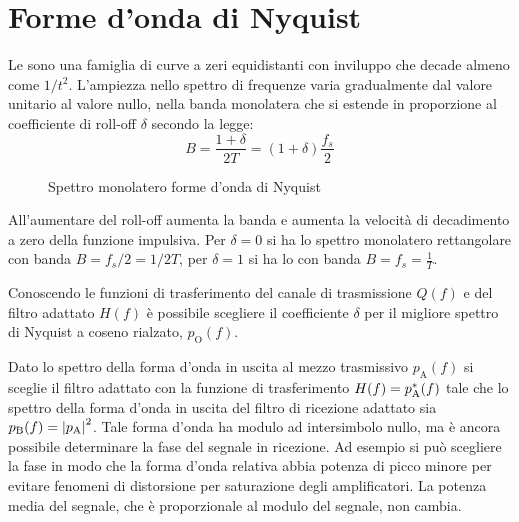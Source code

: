 \section{Forme d'onda di Nyquist}
Le  sono una famiglia di curve a zeri equidistanti con inviluppo che decade almeno come $1/t^2$. L'ampiezza nello spettro di frequenze varia gradualmente dal valore unitario al valore nullo, nella banda monolatera che si estende in proporzione al coefficiente di roll-off $\delta$ secondo la legge:
\begin{equation}
B=\frac{1+\delta}{2T}=(1+\delta)\frac{f_s}{2}
\label{eq:banda_nyquist}
\end{equation}

\begin{figure}[ht!]\centering
{}
\caption{Spettro monolatero forme d'onda di Nyquist}
\label{fig:spettro_forme_donda_Nyquist}
\end{figure}

All'aumentare del roll-off aumenta la banda e aumenta la velocità di decadimento a zero della funzione impulsiva.
Per $\delta=0$ si ha lo spettro monolatero rettangolare con banda $B=f_s/2=1/2T$, per $\delta=1$ si ha lo  con banda $B=f_s=\frac{1}{T}$.

Conoscendo le funzioni di trasferimento del canale di trasmissione $Q(f)$ e del filtro adattato $H(f)$ è possibile scegliere il coefficiente $\delta$ per il migliore spettro di Nyquist a coseno rialzato, $p_\text{O}(f)$.

Dato lo spettro della forma d'onda in uscita al mezzo trasmissivo $p_\text{A}(f)$ si sceglie il filtro adattato con la funzione di trasferimento $H(f)={p}^\ast_\text{A}(f)$ tale che lo spettro della forma d'onda in uscita del filtro di ricezione adattato sia $p_\text{B}(f)=\left|{p_\text{A}}\right|^2$. Tale forma d'onda ha modulo ad intersimbolo nullo, ma è ancora possibile determinare la fase del segnale in ricezione. Ad esempio si può scegliere la fase in modo che la forma d'onda relativa abbia potenza di picco minore per evitare fenomeni di distorsione per saturazione degli amplificatori. La potenza media del segnale, che è proporzionale al modulo del segnale, non cambia.

